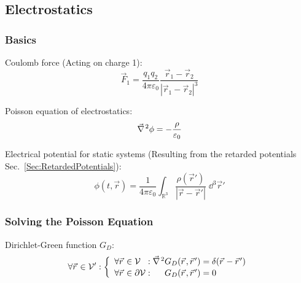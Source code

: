 	\subsection{Electrostatics}
		\subsubsection{Basics}
			\noindent
			Coulomb force (Acting on charge 1):
			\begin{equation}
				\vec{F}_1 = \frac{q_1 q_2}{4\pi\varepsilon_0}\frac{\vec{r}_1-\vec{r}_2}{\left|\vec{r}_1-\vec{r}_2\right|^3}
			\end{equation}

			\noindent
			Poisson equation of electrostatics:
			\begin{equation}
				\Nabla^2\phi = -\frac{\rho}{\varepsilon_0}
				\label{Eq:Poisson}
			\end{equation}

			\noindent
			Electrical potential for static systems (Resulting from the retarded potentials Sec.~\ref{Sec:RetardedPotentials}):
			\begin{equation}
				\phi\left(t,\vec{r}\right)
				= \frac{1}{4\pi\varepsilon_0} \int_{\mathbb{R}^3} \frac{\rho(\vec{r}')}{\left|\vec{r}-\vec{r}'\right|}\;\dd^3 \vec{r}'
			\end{equation}

		\subsubsection{Solving the Poisson Equation}
			\noindent
			Dirichlet-Green function $G_D$:
			\begin{equation}
				\forall\vec{r}\in\mathcal{V}': \left\{\begin{array}{ll}
						\forall\vec{r}\in\mathcal{V}\phantom\partial:
						\Nabla^2 G_D(\vec{r},\vec{r}') = \delta(\vec{r}-\vec{r}') \\
						\forall\vec{r}\in\partial\mathcal{V}:
						\phantom{\Nabla^2}G_D(\vec{r},\vec{r}') = 0
					\end{array}\right.
			\end{equation}

